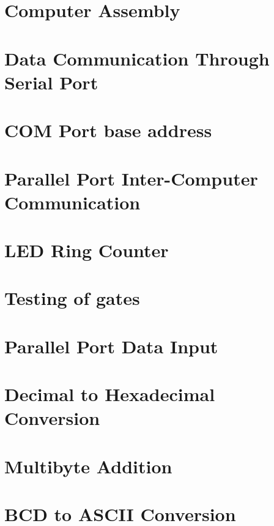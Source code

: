\documentclass[12pt]{report}
\begin{document}
  \chapter{ Computer Assembly}
  
  
  \chapter{ Data Communication Through Serial Port}
  
  
  
  \chapter{ COM Port base address}
  
    
  \chapter{ Parallel Port Inter-Computer Communication}
  
      
  \chapter{ LED Ring Counter}
  
  
   \chapter{ Testing of gates}
   
   
     \chapter{ Parallel Port Data Input}
     
     
  \chapter{ Decimal to Hexadecimal Conversion}
  
  

  \chapter{ Multibyte Addition}
  
  
  \chapter{ BCD to ASCII Conversion}
  
  
\end{document}
